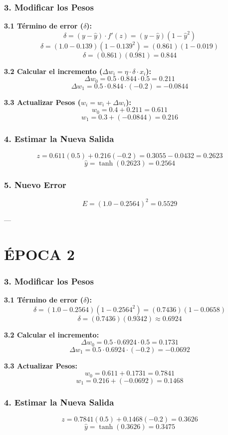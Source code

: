 \documentclass{article}
\begin{document}
\subsubsection*{3. Modificar los Pesos}
\textbf{3.1 Término de error ($\delta$):}
\[ \delta = (y - \hat{y}) \cdot f'(z) = (y - \hat{y})(1 - \hat{y}^2) \]
\[ \delta = (1.0 - 0.139)(1 - 0.139^2) = (0.861)(1 - 0.019) \]
\[ \delta = (0.861)(0.981) = 0.844 \]

\textbf{3.2 Calcular el incremento ($\Delta w_i = \eta \cdot \delta \cdot x_i$):}
\[ \Delta w_{0} = 0.5 \cdot 0.844 \cdot 0.5 = 0.211 \]
\[ \Delta w_{1} = 0.5 \cdot 0.844 \cdot (-0.2) = -0.0844 \]

\textbf{3.3 Actualizar Pesos ($w_i = w_i + \Delta w_i$):}
\[ w_{0} = 0.4 + 0.211 = 0.611 \]
\[ w_{1} = 0.3 + (-0.0844) = 0.216 \]

\subsubsection*{4. Estimar la Nueva Salida}
\[ z = 0.611(0.5) + 0.216(-0.2) = 0.3055 - 0.0432 = 0.2623 \]
\[ \hat{y} = \tanh(0.2623) = 0.2564 \]

\subsubsection*{5. Nuevo Error}
\[ E = (1.0 - 0.2564)^2 = 0.5529 \]

---

\section*{ÉPOCA 2}

\subsubsection*{3. Modificar los Pesos}
\textbf{3.1 Término de error ($\delta$):}
\[ \delta = (1.0 - 0.2564)(1 - 0.2564^2) = (0.7436)(1 - 0.0658) \]
\[ \delta = (0.7436)(0.9342) \approx 0.6924 \]

\textbf{3.2 Calcular el incremento:}
\[ \Delta w_{0} = 0.5 \cdot 0.6924 \cdot 0.5 = 0.1731 \]
\[ \Delta w_{1} = 0.5 \cdot 0.6924 \cdot (-0.2) = -0.0692 \]

\textbf{3.3 Actualizar Pesos:}
\[ w_{0} = 0.611 + 0.1731 = 0.7841 \]
\[ w_{1} = 0.216 + (-0.0692) = 0.1468 \]

\subsubsection*{4. Estimar la Nueva Salida}
\[ z = 0.7841(0.5) + 0.1468(-0.2) = 0.3626 \]
\[ \hat{y} = \tanh(0.3626) = 0.3475 \]
\end{document}
